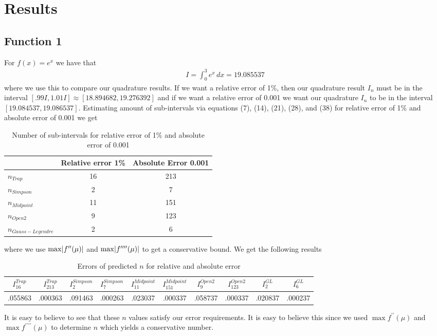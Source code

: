 \documentclass[12pt]{article}
\DeclarePairedDelimiter \abs{\lvert}{\rvert}%
\theoremstyle{remark}
\begin{document}
\newpage

\section{Results} 

\subsection{Function 1}

For $f(x) = e^x$ we have that
\begin{align} 
I = \int_0^3 e^x \, dx = 19.085537
\end{align}
where we use this to compare our quadrature results. If we want a relative error of 1\%, then our quadrature result $I_n$ must be in the interval $[.99I, 1.01I] \approx [18.894682, 19.276392]$ and if we want a relative error of 0.001 we want our quadrature $I_n$ to be in the interval $[19.084537,19.086537]$. Estimating amount of sub-intervals via equations (7), (14), (21), (28), and (38) for relative error of 1\% and absolute error of 0.001 we get

\begin{table}[H]
	\centering
	\begin{tabular}{||l|c|c||}
		\cline{2-3}
		\multicolumn{1}{c|}{} & Relative error 1\% & Absolute Error 0.001 \\ \hline \hline
		$n_{Trap}$ & 16 & 213 \\ \hline
		$n_{Simpson}$ & 2 & 7 \\ \hline
		$n_{Midpoint}$ & 11 & 151 \\ \hline
		$n_{Open2}$ & 9 & 123 \\ \hline
		$n_{Gauss-Legendre}$ & 2 & 6 \\ \hline
	\end{tabular}
	\caption{Number of sub-intervals for relative error of 1\% and absolute error of 0.001}
\end{table}
where we use $\max \abs{f^{\prime\prime}(\mu)}$ and $\max \abs{f^{\prime\prime\prime\prime}(\mu)}$ to get a conservative bound. We get the following results 
\begin{table}[H]
	\centering
	\begin{tabular}{||c|c|c|c|c|c|c|c|c|c||}
		\hline
		 $I_{16}^{Trap}$ & $I_{213}^{Trap}$ & $I_{2}^{Simpson}$ & $I_{7}^{Simpson}$ & $I_{11}^{Midpoint}$ & $I_{151}^{Midpoint}$ & $I_{9}^{Open2}$ & $I_{123}^{Open2}$ & $I_2^{GL}$ & $I_6^{GL}$ \\ \hline \hline
		.055863 & .000363 & .091463 & .000263 & .023037 & .000337 & .058737 & .000337 & .020837 & .000237 \\ \hline
	\end{tabular} 
	\caption{Errors of predicted $n$ for relative and absolute error}
\end{table}
It is easy to believe to see that these $n$ values satisfy our error requirements. It is easy to believe this since we used $\max f^{\prime\prime}(\mu)$ and $\max f^{\prime\prime\prime\prime}(\mu)$ to determine $n$ which yields a conservative number.
\end{document}
